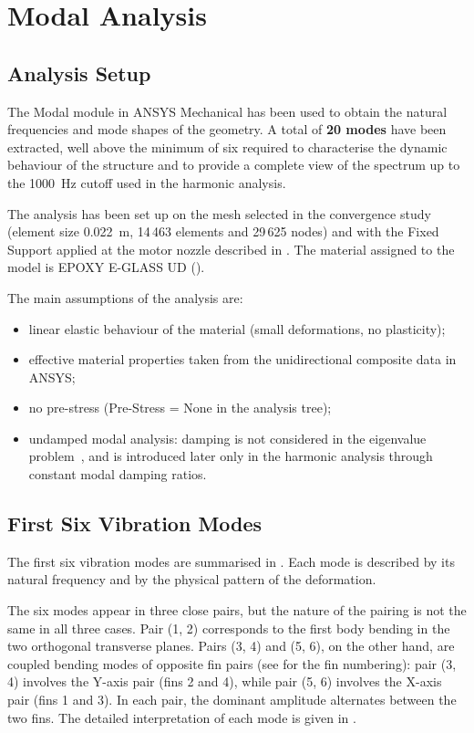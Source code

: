 \section{Modal Analysis}

\subsection{Analysis Setup}

The Modal module in ANSYS Mechanical has been used to obtain the natural frequencies and mode shapes of the geometry. A total of \textbf{20 modes} have been extracted, well above the minimum of six required to characterise the dynamic behaviour of the structure and to provide a complete view of the spectrum up to the \SI{1000}{\hertz} cutoff used in the harmonic analysis.

The analysis has been set up on the mesh selected in the convergence study (element size \SI{0.022}{\metre}, 14\,463 elements and 29\,625 nodes) and with the Fixed Support applied at the motor nozzle described in . The material assigned to the model is EPOXY E-GLASS UD ().

The main assumptions of the analysis are:
\begin{itemize}
    \item linear elastic behaviour of the material (small deformations, no plasticity);
    \item effective material properties taken from the unidirectional composite data in ANSYS;
    \item no pre-stress (Pre-Stress = None in the analysis tree);
    \item undamped modal analysis: damping is not considered in the eigenvalue problem~\cite{inman_engineering_vibration}, and is introduced later only in the harmonic analysis through constant modal damping ratios.
\end{itemize}

\subsection{First Six Vibration Modes}

The first six vibration modes are summarised in . Each mode is described by its natural frequency and by the physical pattern of the deformation.

The six modes appear in three close pairs, but the nature of the pairing is not the same in all three cases. Pair (1, 2) corresponds to the first body bending in the two orthogonal transverse planes. Pairs (3, 4) and (5, 6), on the other hand, are coupled bending modes of opposite fin pairs (see  for the fin numbering): pair (3, 4) involves the Y-axis pair (fins 2 and 4), while pair (5, 6) involves the X-axis pair (fins 1 and 3). In each pair, the dominant amplitude alternates between the two fins. The detailed interpretation of each mode is given in .

